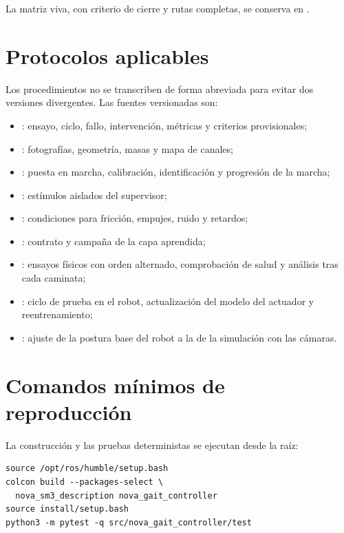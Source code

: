 La matriz viva, con criterio de cierre y rutas completas, se conserva en
.

\section{Protocolos aplicables}

Los procedimientos no se transcriben de forma abreviada para evitar dos
versiones divergentes. Las fuentes versionadas son:

\begin{itemize}
\item {}: ensayo, ciclo,
fallo, intervención, métricas y criterios provisionales;
\item {}: fotografías,
geometría, masas y mapa de canales;
\item {}: puesta en marcha, calibración,
identificación y progresión de la marcha;
\item {}: estímulos
aislados del supervisor;
\item {}: condiciones para
fricción, empujes, ruido y retardos;
\item {}: contrato y campaña de la
capa aprendida;
\item {}: ensayos físicos
con orden alternado, comprobación de salud y análisis tras cada caminata;
\item {}: ciclo de prueba en el robot,
actualización del modelo del actuador y reentrenamiento;
\item {}: ajuste de la
postura base del robot a la de la simulación con las cámaras.
\end{itemize}

\section{Comandos mínimos de reproducción}

La construcción y las pruebas deterministas se ejecutan desde la raíz:

{\footnotesize
\begin{verbatim}
source /opt/ros/humble/setup.bash
colcon build --packages-select \
  nova_sm3_description nova_gait_controller
source install/setup.bash
python3 -m pytest -q src/nova_gait_controller/test
\end{verbatim}
}

